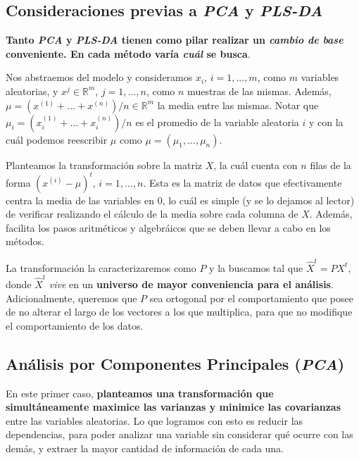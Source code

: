 \subsection{Consideraciones previas a \textit{PCA} y \textit{PLS-DA}}\label{intro_consideraciones}

\textbf{Tanto \textit{PCA} y \textit{PLS-DA} tienen como pilar realizar un \textit{cambio de base} conveniente. En cada m\'etodo var\'ia \textit{cu\'al} se busca}.

Nos abstraemos del modelo y consideramos $x_{i}$, $i = 1, ..., m$, como $m$ variables aleatorias, y $x^{j} \in \mathbb{R}^m$, $j = 1, ..., n$, como $n$ muestras de las mismas. Adem\'as, $\mu = (x^{(1)} + ... + x^{(n)}) / n \in \mathbb{R}^{m}$ la media entre las mismas. Notar que $\mu_{i} = (x^{(1)}_{i} + ... + x^{(n)}_{i}) / n$ es el promedio de la variable aleatoria $i$ y con la cu\'al podemos reescribir $\mu$ como $\mu = (\mu_{1}, ..., \mu_{n})$.

Planteamos la transformaci\'on sobre la matriz $X$, la cu\'al cuenta con $n$ filas de la forma $(x^{(i)} - \mu)^t$, $i = 1, ..., n$. Esta es la matriz de datos que efectivamente centra la media de las variables en $0$, lo cu\'al es simple (y se lo dejamos al lector) de verificar realizando el c\'alculo de la media sobre cada columna de $X$. Adem\'as, facilita los pasos aritm\'eticos y algebr\'aicos que se deben llevar a cabo en los m\'etodos.

La transformaci\'on la caracterizaremos como $P$ y la buscamos tal que $\hat{X}^{t} = PX^{t}$, donde $\hat{X}^{t}$ \textit{vive} en un \textbf{universo de mayor conveniencia para el an\'alisis}. Adicionalmente, queremos que $P$ sea ortogonal por el comportamiento que posee de no alterar el largo de los vectores a los que multiplica, para que no modifique el comportamiento de los datos.

\subsection{An\'alisis por Componentes Principales (\textit{PCA})} \label{intro_PCA}

En este primer caso, \textbf{planteamos una transformaci\'on que simult\'aneamente maximice las varianzas y minimice las covarianzas} entre las variables aleatorias. Lo que logramos con esto es reducir las dependencias, para poder analizar una variable sin considerar qu\'e ocurre con las dem\'as, y extraer la mayor cantidad de informaci\'on de cada una.

